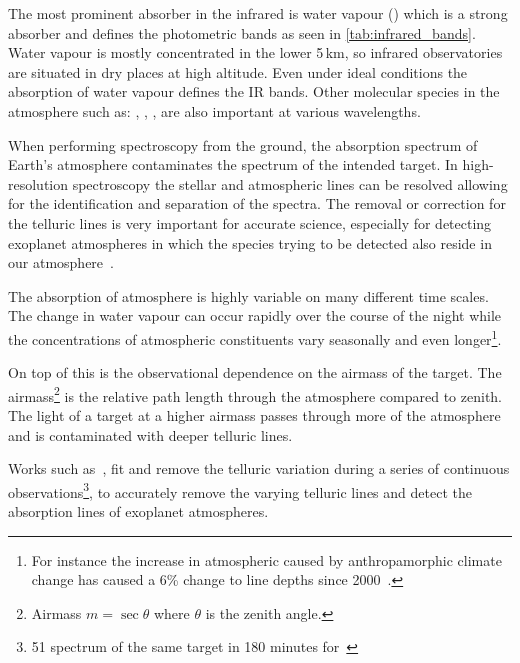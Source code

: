 

The most prominent absorber in the infrared is water vapour () which is a strong absorber and defines the photometric bands as seen in \cref{tab:infrared_bands}.
Water vapour is mostly concentrated in the lower 5\,\si{\kilo\metre}, so infrared observatories are situated in dry places at high altitude.
Even under ideal conditions the absorption of water vapour defines the IR bands.
Other molecular species in the atmosphere such as: , , , are also important at various wavelengths.

When performing spectroscopy from the ground, the absorption spectrum of Earth's atmosphere contaminates the spectrum of the intended target.
In high-resolution spectroscopy the stellar and atmospheric lines can be resolved allowing for the identification and separation of the spectra.
The removal or correction for the telluric lines is very important for accurate science, especially for detecting exoplanet atmospheres in which the species trying to be detected also reside in our atmosphere~\citep{snellen_orbital_2010, brogi_carbon_2014, dekok_detection_2013}.

The absorption of atmosphere is highly variable on many different time scales.
The change in water vapour can occur rapidly over the course of the night while the concentrations of atmospheric constituents vary seasonally and even longer\footnote{For instance the increase in atmospheric  caused by anthropamorphic climate change has caused a 6\% change to  line depths since 2000~\citep{smette_molecfit_2015}.}.

On top of this is the observational dependence on the airmass of the target.
The airmass\footnote{Airmass $m=\sec{\theta}$ where $\theta$ is the zenith angle.} is the relative path length through the atmosphere compared to zenith.
The light of a target at a higher airmass passes through more of the atmosphere and is contaminated with deeper telluric lines.

Works such as~\citet{snellen_orbital_2010}, fit and remove the telluric variation during a series of continuous observations\footnote{51 spectrum of the same target in 180 minutes for~\citet{snellen_orbital_2010}}, to accurately remove the varying telluric lines and detect the absorption lines of exoplanet atmospheres.
